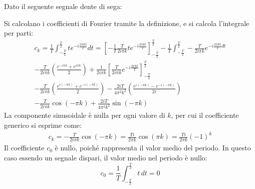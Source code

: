 \documentclass{article}
\numberwithin{equation}{subsection}
\begin{document}
Dato il seguente segnale dente di sega:
\begin{center}
\end{center}


Si calcolano i coefficienti di Fourier tramite la definizione, e si calcola l'integrale per parti: 
\begin{gather*}
    c_k=\displaystyle\frac{1}{T}\int_{-\frac{T}{2}}^{\frac{T}{2}}te^{-i\frac{2\pi kt}{T}}dt=\displaystyle\left[-\frac{1}{T}\frac{T}{2i\pi k}te^{-i\frac{2\pi kt}{T}}\right]_{-\frac{T}{2}}^{\frac{T}{2}}-
    \frac{1}{T}\int_{-\frac{T}{2}}^{\frac{T}{2}}-\frac{T}{2i\pi k}e^{-i\frac{2\pi kt}{T}dt}\\
    \displaystyle-\frac{T}{2i\pi k}\left(\frac{e^{-i\pi k}+e^{i\pi k}}{2}\right)+\frac{1}{2i\pi k}\left[\frac{T}{2i\pi k}e^{-i\frac{2\pi kt}{T}}\right]_{-\frac{T}{2}}^{\frac{T}{2}}\\
    \displaystyle-\frac{T}{2i\pi k}\left(\frac{e^{i(-\pi k)}+e^{-i(-\pi k)}}{2}\right)-\frac{2iT}{4\pi^2k^2}\left(\frac{e^{i(-\pi k)}-e^{-i(-\pi k)}}{2i}\right)\\
    \displaystyle-\frac{T}{2i\pi k}\cos\left(-\pi k\right)+\frac{2iT}{4\pi^2k^2}\sin(-\pi k)
\end{gather*}
La componente sinusoidale è nulla per ogni valore di $k$, per cui il coefficiente generico si esprime come:
\begin{gather*}
    c_k=\displaystyle-\frac{T}{2i\pi k}\cos(-\pi k)=\frac{Ti}{2\pi k}\cos(\pi k)=\frac{Ti}{2\pi k}(-1)^k
\end{gather*}
Il coefficiente $c_0$ è nullo, poiché rappresenta il valor medio del periodo. In questo caso essendo un segnale dispari, il valor medio nel periodo è nullo:
\begin{equation*}
    c_0=\displaystyle\frac{1}{T}\int_{-\frac{T}{2}}^{\frac{T}{2}}t\,dt=0
\end{equation*}
\end{document}
